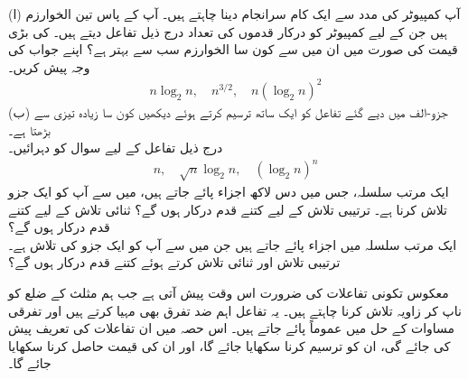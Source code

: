 (ا) آپ کمپیوٹر کی مدد سے ایک کام سرانجام دینا چاہتے ہیں۔ آپ کے پاس تین الخوارزم   ہیں جن  کے لیے کمپیوٹر کو درکار   قدموں کی تعداد  درج ذیل تفاعل دیتے ہیں۔  کی بڑی قیمت کی صورت میں ان میں سے کون سا الخوارزم سب سے بہتر  ہے؟ اپنے جواب کی وجہ پیش کریں۔
\begin{align*}
n\log_2n,\quad n^{3/2},\quad n(\log_2n)^2
\end{align*}
(ب) جزو-الف میں دیے گئے تفاعل کو ایک ساتھ ترسیم کرتے ہوئے دیکھیں کون سا زیادہ تیزی سے بڑھتا ہے۔\\
درج ذیل تفاعل کے لیے سوال  کو دہرائیں۔
\begin{align*}
n,\quad \sqrt{n}\log_2n,\quad (\log_2n)^n
\end{align*}
ایک مرتب سلسلہ،  جس میں دس لاکھ اجزاء پائے جاتے ہیں، میں سے آپ کو ایک جزو تلاش کرنا ہے۔ ترتیبی تلاش کے لیے کتنے قدم درکار ہوں گے؟ ثنائی تلاش کے لیے کتنے قدم درکار ہوں گے؟\\
ایک مرتب سلسلہ میں  اجزاء پائے جاتے ہیں جن میں سے آپ کو ایک جزو کی تلاش ہے۔ ترتیبی تلاش اور ثنائی تلاش کرتے ہوئے کتنے قدم درکار ہوں گے؟




معکوس تکونی تفاعلات کی ضرورت اس وقت پیش آتی ہے جب ہم مثلث کے ضلع کو ناپ کر زاویہ تلاش کرنا چاہتے ہیں۔ یہ تفاعل اہم ضد تفرق بھی مہیا کرتے ہیں اور تفرقی مساوات کے حل میں عموماً پائے جاتے ہیں۔ اس حصہ میں ان تفاعلات کی تعریف پیش کی جائے گی، ان کو ترسیم کرنا سکھایا جائے گا،  اور ان کی قیمت حاصل کرنا سکھایا جائے گا۔

